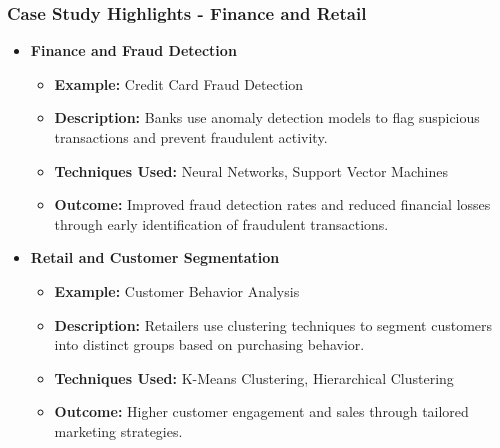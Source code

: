 \documentclass[aspectratio=169]{beamer}
\begin{document}
\begin{frame}[fragile]
    \frametitle{Case Study Highlights - Finance and Retail}
    \begin{itemize}
        \item \textbf{Finance and Fraud Detection}
        \begin{itemize}
            \item \textbf{Example:} Credit Card Fraud Detection
            \item \textbf{Description:} Banks use anomaly detection models to flag suspicious transactions and prevent fraudulent activity.
            \item \textbf{Techniques Used:} Neural Networks, Support Vector Machines
            \item \textbf{Outcome:} Improved fraud detection rates and reduced financial losses through early identification of fraudulent transactions.
        \end{itemize}
        
        \item \textbf{Retail and Customer Segmentation}
        \begin{itemize}
            \item \textbf{Example:} Customer Behavior Analysis
            \item \textbf{Description:} Retailers use clustering techniques to segment customers into distinct groups based on purchasing behavior.
            \item \textbf{Techniques Used:} K-Means Clustering, Hierarchical Clustering
            \item \textbf{Outcome:} Higher customer engagement and sales through tailored marketing strategies.
        \end{itemize}
    \end{itemize}
\end{frame}
\end{document}
